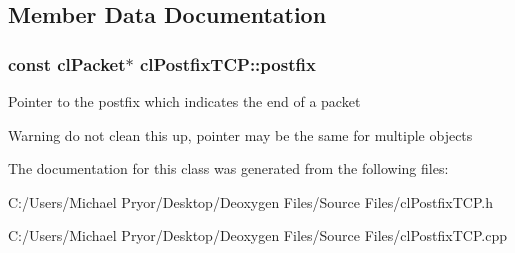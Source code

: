 \subsection{Member Data Documentation}
\hypertarget{classcl_postfix_t_c_p_a505a8a31942635616ccca3922e06454b}{
\subsubsection[{postfix}]{\setlength{\rightskip}{0pt plus 5cm}const {\bf clPacket}$\ast$ {\bf clPostfixTCP::postfix}}}
\label{classcl_postfix_t_c_p_a505a8a31942635616ccca3922e06454b}
Pointer to the postfix which indicates the end of a packet \begin{DoxyWarning}{Warning}
do not clean this up, pointer may be the same for multiple objects 
\end{DoxyWarning}


The documentation for this class was generated from the following files:\begin{DoxyCompactItemize}
\item 
C:/Users/Michael Pryor/Desktop/Deoxygen Files/Source Files/clPostfixTCP.h\item 
C:/Users/Michael Pryor/Desktop/Deoxygen Files/Source Files/clPostfixTCP.cpp\end{DoxyCompactItemize}
